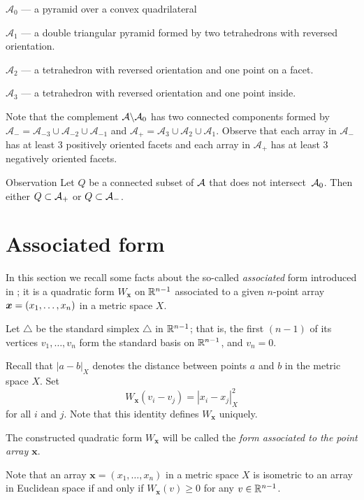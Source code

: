 \documentclass{article}
\begin{document}
$\mathcal{A}_{0}$ --- a pyramid over a convex quadrilateral 

$\mathcal{A}_{1}$ --- a double triangular pyramid formed by two tetrahedrons with reversed orientation.

$\mathcal{A}_{2}$ --- a tetrahedron with reversed orientation and one point on a facet.

$\mathcal{A}_{3}$ --- a tetrahedron with reversed orientation and one point inside.

Note that the complement $\mathcal{A}\backslash \mathcal{A}_0$ has two connected components formed by $\mathcal{A}_{-}=\mathcal{A}_{-3}\cup \mathcal{A}_{-2}\cup\mathcal{A}_{-1}$ and $\mathcal{A}_{+}=\mathcal{A}_{3}\cup \mathcal{A}_{2}\cup\mathcal{A}_{1}$.
Observe that each array in $\mathcal{A}_{-}$ has at least 3 positively oriented facets and each array in $\mathcal{A}_{+}$ has at least 3 negatively oriented facets.

\begin{thm}{Observation}\label{obs:connectedA}
Let $Q$ be a connected subset of $\mathcal{A}$ that does not intersect~$\mathcal{A}_0$.
Then either $Q\subset \mathcal{A}_+$ or $Q\subset \mathcal{A}_-$.
\end{thm}


\section{Associated form}

In this section we recall some facts about the so-called \emph{associated} form introduced in \cite{petrunin-2017};
it is a quadratic form 
$W_{\bm{x}}$ on $\mathbb{R}^{n-1}$ associated
to a given $n$-point array $\bm{x}\z=(x_1,\dots,x_n)$ in a metric space $X$.

Let $\triangle$ be the standard simplex $\triangle$ in $\mathbb{R}^{n-1}$; that is, the first $(n-1)$ of its vertices $v_1,\dots,v_n$ form the standard basis on $\mathbb{R}^{n-1}$,
 and $v_n=0$.

Recall that $|a-b|_X$ denotes the distance between points $a$ and $b$ in the metric space $X$.
Set
\[W_{\bm{x}}(v_i-v_j)=|x_i-x_j|^2_X\] 
for all $i$ and $j$.
Note that this identity defines $W_{\bm{x}}$ uniquely.


The constructed quadratic form $W_{\bm{x}}$ will be called the \emph{form associated to the point array $\bm{x}$}.

Note that an array $\bm{x}=(x_1,\dots,x_n)$ in a metric space $X$ is isometric to an array in Euclidean space if and only if 
$W_{\bm{x}}(v)\ge 0$
for any $v\in \mathbb{R}^{n-1}$.
\end{document}
